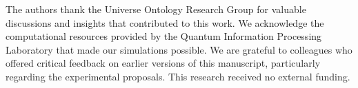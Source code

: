 The authors thank the Universe Ontology Research Group for valuable discussions and insights that contributed to this work. We acknowledge the computational resources provided by the Quantum Information Processing Laboratory that made our simulations possible. We are grateful to colleagues who offered critical feedback on earlier versions of this manuscript, particularly regarding the experimental proposals. This research received no external funding.
